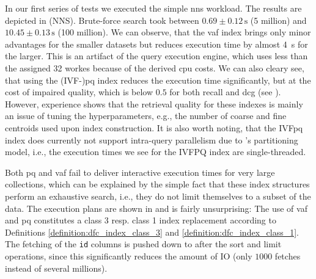 In our first series of tests we executed the simple \acrshort{nns} workload. The results are depicted in  (NNS). Brute-force search took between $0.69 \pm 0.12 \, \si{\second}$ (5 million) and $10.45 \pm 0.13 \, \si{\second}$ (100 million). We can observe, that the \acrshort{vaf} index brings only minor advantages for the smaller datasets but reduces execution time by almost \SI{4}{\second} for the larger. This is an artifact of the query execution engine, which uses less than the assigned 32 workes because of the derived \acrshort{cpu} costs. We can also cleary see, that using the (IVF-)\acrshort{pq} index reduces the execution time significantly, but at the cost of impaired quality, which is below $0.5$ for both recall and \acrshort{dcg} (see ). However, experience shows that the retrieval quality for these indexes is mainly an issue of tuning the hyperparameters, e.g., the number of coarse and fine centroids used upon index construction. It is also worth noting, that the IVF\acrshort{pq} index does currently not support intra-query parallelism due to \cottontail{}'s partitioning model, i.e., the execution times we see for the IVFPQ index are single-threaded. 

Both \acrshort{pq} and \acrshort{vaf} fail to deliver interactive execution times for very large collections, which can be explained by  the simple fact that these index structures perform an exhaustive search, i.e., they do not limit themselves to a subset of the data. The execution plans are shown in  and is fairly unsurprising: The use of \acrshort{vaf} and \acrshort{pq} constitutes a class 3 resp. class 1 index replacement according to Definitions \ref{definition:dfc_index_class_3} and \ref{definition:dfc_index_class_1}. The fetching of the \texttt{id} columns is pushed down to after the sort and limit operations, since this significantly reduces the amount of IO (only $1000$ fetches instead of several millions).

